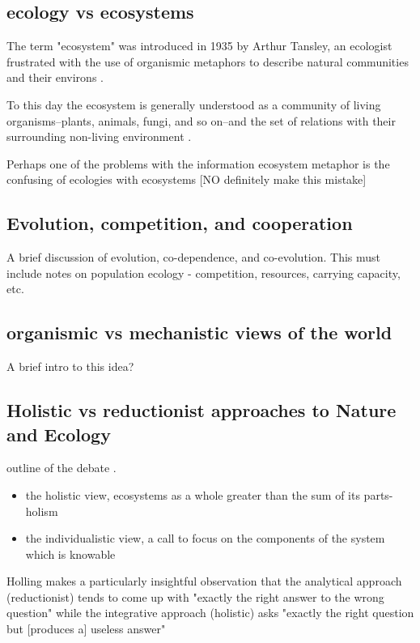 \subsection{ecology vs ecosystems}

The term "ecosystem" was introduced in 1935 by Arthur Tansley, an ecologist frustrated with the use of organismic metaphors to describe natural communities and their environs \cite{tansley_1935}. 

To this day the ecosystem is generally understood as a community of living organisms--plants, animals, fungi, and so on--and the set of relations with their surrounding non-living environment \cite{tansley_1935, odum_1953}. 

Perhaps one of the problems with the information ecosystem metaphor is the confusing of ecologies with ecosystems [NO definitely make this mistake]



\subsection{Evolution, competition, and cooperation}

A brief discussion of evolution, co-dependence, and co-evolution. This must include notes on population ecology - competition, resources, carrying capacity, etc.

\subsection{organismic vs mechanistic views of the world}

A brief intro to this idea?

\subsection{Holistic vs reductionist approaches to Nature and Ecology}

outline of the debate \cite{holling_1998, worster_1977}. \begin{itemize} \item the holistic view, ecosystems as a whole greater than the sum of its parts-holism \cite{clements_1936} \item the individualistic view, a call to focus on the components of the system which is knowable \cite{gleason_1939} \end{itemize}

Holling makes a particularly insightful observation that the analytical approach (reductionist) tends to come up with "exactly the right answer to the wrong question" while the integrative approach (holistic) asks "exactly the right question but [produces a] useless answer" \cite[][p. 3]{holling_1998} 

